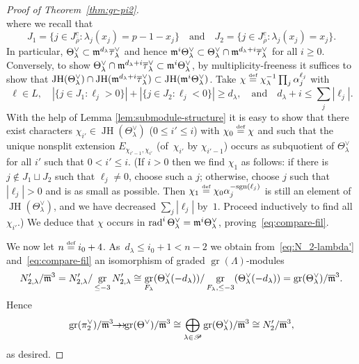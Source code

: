 \documentclass[JEP,XML,SOM,Unicode,NoFloatCountersInSection, NoEqCountersInSection,published]{cedram}
\newcommand{\onto}{\mathchoice{\to\hspace*{-5mm}\to}{\mathrel{\hbox{$\to\hspace*{-2.85mm}\to$}}}{\to\hspace*{-3mm}\to}{\to\hspace*{-3mm}\to}}
\newcommand{\quand}{\quad\text{and}\quad}
\let\ovl\overline
\newcommand{\defeq}{\stackrel{\textrm{\tiny{\upshape{def}}}}{=}}
\renewcommand{\P}{\mathscr P}
\newcommand{\sgn}{\mathrm{sgn}}
\newcommand{\rhobar}{\overline{\rho}}
\DeclareMathOperator{\gr}{gr}
\DeclareMathOperator{\JH}{\mathrm{JH}}
\DeclareMathOperator{\rad}{rad}
\theoremstyle{plain}
\theoremstyle{definition}
\begin{document}
\begin{proof}[Proof of Theorem~\ref{thm:gr-pi2}]
\begin{equation*}
\end{equation*}
where we recall that\vspace*{-3pt}
\[
J_1 = \{ j \in J_{\rhobar}^c: \lambda_j(x_j) = p-1-x_j \}\quand J_2 = \{ j \in J_{\rhobar}^c: \lambda_j(x_j) = x_j \}.
\]
In particular, $\Theta_\lambda^\vee \subset \m^{d_\lambda} \ovl\tau_\lambda^\vee$ and hence $\m^i \Theta_\lambda^\vee \subset \Theta_\lambda^\vee \cap \m^{d_\lambda+i} \ovl\tau_\lambda^\vee$ for all $i \ge 0$.
Conversely, to show $\Theta_\lambda^\vee \cap \m^{d_\lambda+i} \ovl\tau_\lambda^\vee \subset \m^i \Theta_\lambda^\vee$, by multiplicity-freeness it suffices to show that $\JH(\Theta_\lambda^\vee) \cap \JH(\m^{d_\lambda+i} \ovl\tau_\lambda^\vee) \subset \JH(\m^i \Theta_\lambda^\vee)$.
Take $\chi \defeq \chi_\lambda^{-1} \prod_j \alpha_j^{\ell_j}$ with\vspace*{-3pt}
\[
\ell \in L,\quad |\{j \in J_1: \ell_j > 0\}|+|\{j \in J_2: \ell_j < 0\}| \ge d_\lambda,\quand d_\lambda+i \le \sum_j |\ell_j|.
\]
With the help of Lemma \ref{lem:submodule-structure} it is easy to show that there exist characters $\chi_{i'} \in \JH(\Theta_\lambda^\vee)$ ($0 \le i' \le i$) with $\chi_0 \defeq \chi$ and such that the unique nonsplit extension $E_{\chi_{i'-1},\chi_{i'}}$ (of~$\chi_{i'}$ by $\chi_{i'-1}$) occurs as subquotient of $\Theta_\lambda^\vee$ for all $i'$ such that $0 < i' \le i$.
(If $i > 0$ then we find $\chi_1$ as follows: if there is $j \notin J_1 \sqcup J_2$ such that $\ell_j \ne 0$, choose such a $j$;
otherwise, choose $j$ such that $|\ell_j| > 0$ and is as small as possible.
Then $\chi_1 \defeq \chi_0 \alpha_j^{-\sgn(\ell_j)}$ is still an element of $\JH(\Theta_\lambda^\vee)$, and we have decreased $\sum_j |\ell_j|$ by~$1$.
Proceed inductively to find all $\chi_{i'}$.) We deduce that $\chi$ occurs in $\rad^i \Theta_\lambda^\vee = \m^i \Theta_\lambda^\vee$, proving~\eqref{eq:compare-fil}.

We now let $n \defeq i_0+4$. As~$d_\lambda \le i_0+1 < n-2$ we obtain from~\eqref{eq:N_2-lambda'} and~\eqref{eq:compare-fil} an isomorphism of graded $\gr(\Lambda)$-modules
\begin{equation*}
N_{2,\lambda}'/\ovl\m^3 = N_{2,\lambda}'/\gr_{\le -3} N_{2,\lambda}' \cong \gr_{F_\lambda}(\Theta_\lambda^\vee(-d_\lambda))/\gr_{F_\lambda,\le -3}(\Theta_\lambda^\vee(-d_\lambda)) = \gr(\Theta_\lambda^\vee)/\ovl\m^3.
\end{equation*}
Hence\vspace*{-3pt}
\begin{equation}
\label{eq:grad2:surj}
\gr(\pi_2^\vee)/\ovl\m^3 \onto \gr(\Theta^\vee)/\ovl\m^3 \cong \bigoplus_{\lambda \in \P} \gr(\Theta_\lambda^\vee)/\ovl\m^3 \cong N_2'/\ovl\m^3,
\end{equation}
as desired.


\end{proof}
\end{document}
